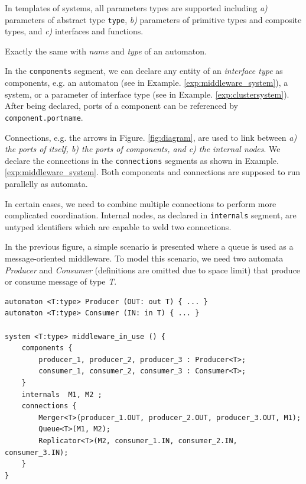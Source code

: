 In templates of systems, all parameters types are supported including \emph{a)} parameters of abstract type \texttt{type}, \emph{b)} parameters of primitive types and composite types, and \emph{c)} interfaces and functions.

 Exactly the same with \emph{name} and \emph{type} of an automaton.

 In the \texttt{components} segment, we can declare any entity of an \emph{interface type} as components, e.g. an automaton (see in Example. \ref{exp:middleware_system}), a system, or a parameter of interface type (see in Example. \ref{exp:clustersystem}). 
After being declared, ports of a component can be referenced by \texttt{component.portname}.

 Connections, e.g. the arrows in Figure. \ref{fig:diagram}, are used to link between \emph{a) the ports of itself, b) the ports of components, and c) the internal nodes}. We declare the connections in the \texttt{connections} segments as shown in Example. \ref{exp:middleware_system}.
Both components and connections are supposed to run parallelly as automata.

 In certain cases, we need to combine multiple connections to perform more complicated coordination. Internal nodes, as declared in \texttt{internals} segment, are untyped identifiers which are capable to weld two connections.


\begin{example} In the previous figure, a simple scenario is presented where a queue is used as a message-oriented middleware. To model this scenario, we need two automata \emph{Producer} and \emph{Consumer} (definitions are omitted due to space limit) that produce or consume message of type \emph{T}.
\begin{lstlisting}
automaton <T:type> Producer (OUT: out T) { ... }
automaton <T:type> Consumer (IN: in T) { ... }

system <T:type> middleware_in_use () {
    components {
        producer_1, producer_2, producer_3 : Producer<T>;
        consumer_1, consumer_2, consumer_3 : Consumer<T>;
    }
    internals  M1, M2 ;
    connections {
        Merger<T>(producer_1.OUT, producer_2.OUT, producer_3.OUT, M1);
        Queue<T>(M1, M2);
        Replicator<T>(M2, consumer_1.IN, consumer_2.IN, consumer_3.IN);
    }
}
\end{lstlisting}
\label{exp:middleware_system}
\end{example}

